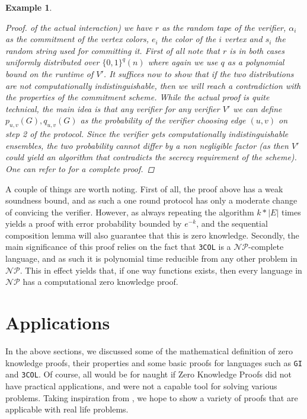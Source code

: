 \documentclass{article}
\newtheorem{example}{Example}
\begin{document}
\begin{example}
\begin{proof}
        of the actual interaction)
        we have $r$ as the random tape of the verifier, $\alpha_i$ as the commitment of the vertex colors, $e_i$ the color of the $i$ vertex and $s_i$ the 
        random string used for committing it. First of all note that $r$ is in both cases uniformly distributed over $\{0, 1\}^q(n)$ where again we 
        use $q$ as a polynomial bound on the runtime of $V'$. It suffices now to show that if the two distributions are
        not computationally indistinguishable, then we will reach a contradiction with the properties of the commitment scheme. 
        While the actual proof is quite technical, the main idea is that any verifier for any verifier $V'$ we can
        define $p_{u, v}(G), q_{u,v}(G)$ as the probability of the verifier choosing edge $(u,v)$ on step 2 of the protocol.
        Since the verifier gets computationally indistinguishable ensembles, the two probability cannot differ by a non negligible factor 
        (as then $V'$ could yield an algorithm that contradicts the secrecy requirement of the scheme). One can refer to \cite{goldreichFoundationsCryptographyVol2007}
        for a complete proof.
        
    \end{proof}
\end{example}

A couple of things are worth noting. First of all, the proof above has a weak soundness bound, and as such 
a one round protocol has only a moderate change of convicing the verifier. However, as always repeating the 
algorithm $k * |E|$ times yields a proof with error probability bounded by $e^{-k}$, and the sequential composition lemma will
also guarantee that this is zero knowledge. Secondly, the main significance of this proof relies on the fact that 
\texttt{3COL} is a $\mathcal{NP}$-complete language, and as such it is polynomial time reducible from any other problem in $\mathcal{NP}$.
This in effect yields that, if one way functions exists, then every language in $\mathcal{NP}$ has a computational zero knowledge proof.

\section{Applications}
In the above sections, we discussed some of the mathematical definition of zero knowledge proofs, their properties and some basic
proofs for languages such as \texttt{GI} and \texttt{3COL}. Of course, all would be for naught if Zero Knowledge Proofs
did not have practical applications, and were not a capable tool for solving various problems. 
Taking inspiration from \cite{moraisSurveyZeroKnowledge2019}, we hope to show a variety of proofs that 
are applicable with real life problems. 
\end{document}
